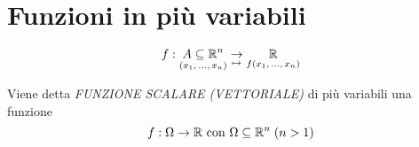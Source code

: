\section{Funzioni in più variabili}
\begin{equation}
    f: \underset{(x_1, \, \dotsc, \, x_n)}{A \subseteq \mathbb{R}^n} \underset{\mapsto}{\to} \underset{f(x_1, \, \dotsc, \, x_n)}{\mathbb{R}}
\end{equation}

\begin{definition}
    Viene detta \emph{FUNZIONE SCALARE (VETTORIALE)} di più variabili una funzione
    \begin{equation}
        f: \Omega \to \mathbb{R}  \mbox{ con } \Omega \subseteq \mathbb{R}^n \; (n>1)
    \end{equation}
\end{definition}